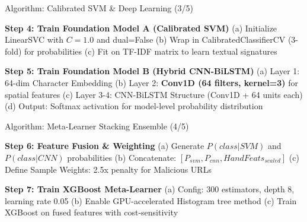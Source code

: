 \documentclass[aspectratio=169,xcolor=dvipsnames]{beamer}
\begin{document}
\begin{frame}{Algorithm: Calibrated SVM \& Deep Learning (3/5)}
\begin{algorithm}[H]
\small
\begin{algorithmic}

  \State \textbf{Step 4: Train Foundation Model A (Calibrated SVM)}
  \State \hspace{1.2em}(a) Initialize LinearSVC with $C=1.0$ and dual=False
  \State \hspace{1.2em}(b) Wrap in CalibratedClassifierCV (3-fold) for probabilities
  \State \hspace{1.2em}(c) Fit on TF-IDF matrix to learn textual signatures

  \State \textbf{Step 5: Train Foundation Model B (Hybrid CNN-BiLSTM)}
  \State \hspace{1.2em}(a) Layer 1: 64-dim Character Embedding
  \State \hspace{1.2em}(b) Layer 2: \textbf{Conv1D (64 filters, kernel=3)} for spatial features
  \State \hspace{1.2em}(c) Layer 3-4: CNN-BiLSTM Structure (Conv1D + 64 units each)
  \State \hspace{1.2em}(d) Output: Softmax activation for model-level probability distribution

\end{algorithmic}
\end{algorithm}
\end{frame}

\begin{frame}{Algorithm: Meta-Learner Stacking Ensemble (4/5)}
\begin{algorithm}[H]
\small
\begin{algorithmic}

  \State \textbf{Step 6: Feature Fusion \& Weighting}
  \State \hspace{1.2em}(a) Generate $P(class|SVM)$ and $P(class|CNN)$ probabilities
  \State \hspace{1.2em}(b) Concatenate: $[P_{svm}, P_{cnn}, HandFeats_{scaled}]$
  \State \hspace{1.2em}(c) Define Sample Weights: 2.5x penalty for Malicious URLs

  \State \textbf{Step 7: Train XGBoost Meta-Learner}
  \State \hspace{1.2em}(a) Config: 300 estimators, depth 8, learning rate 0.05
  \State \hspace{1.2em}(b) Enable GPU-accelerated Histogram tree method
  \State \hspace{1.2em}(c) Train XGBoost on fused features with cost-sensitivity

\end{algorithmic}
\end{algorithm}
\end{frame}
\end{document}
